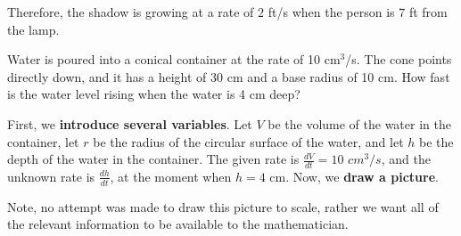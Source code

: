\documentclass{ximera}
\begin{document}
\begin{example}
\begin{explanation}
			Therefore, the shadow is growing
			at a rate of $2$ ft/s when the person is $7$ ft from the lamp.\\
		\end{explanation}
	\end{example}
	
	
	\begin{example}
		Water is poured into a conical container at the rate of 10
		cm${}^3$/s.  The cone points directly down, and it has a height of
		30 cm and a base radius of 10 cm.  How fast is the water level rising
		when the water is 4 cm deep?
		
		\begin{explanation}
			First, we \textbf{introduce several variables}. Let $V$ be the volume of the water in the container, let $r$ be the radius of the circular surface of the water, and  let $h$ be the depth of the water in the container. The given rate is $\frac{dV}{dt}=10$ $cm^3/s$, and the unknown rate is $\frac{dh}{dt}$, at the moment when $h=4$ cm.
			Now, we \textbf{draw a picture}.
			\begin{image}
			\end{image}
			Note, no attempt was made to draw this picture to scale, rather we
			want all of the relevant information to be available to the
			mathematician.
			

\end{explanation}
\end{example}
\end{document}

